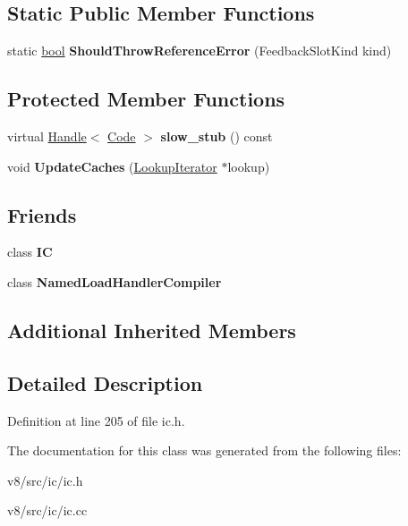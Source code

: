 \subsection*{Static Public Member Functions}
\begin{DoxyCompactItemize}
\item 
\mbox{\label{classv8_1_1internal_1_1LoadIC_a012637513bc1837e51f7ad5b7b55288a}} 
static \mbox{\hyperlink{classbool}{bool}} {\bfseries Should\+Throw\+Reference\+Error} (Feedback\+Slot\+Kind kind)
\end{DoxyCompactItemize}
\subsection*{Protected Member Functions}
\begin{DoxyCompactItemize}
\item 
\mbox{\label{classv8_1_1internal_1_1LoadIC_a8d18be74bf36e2d94ee495119b1b034b}} 
virtual \mbox{\hyperlink{classv8_1_1internal_1_1Handle}{Handle}}$<$ \mbox{\hyperlink{classv8_1_1internal_1_1Code}{Code}} $>$ {\bfseries slow\+\_\+stub} () const
\item 
\mbox{\label{classv8_1_1internal_1_1LoadIC_a16c61b33868d2d10cd64a1acff513cb8}} 
void {\bfseries Update\+Caches} (\mbox{\hyperlink{classv8_1_1internal_1_1LookupIterator}{Lookup\+Iterator}} $\ast$lookup)
\end{DoxyCompactItemize}
\subsection*{Friends}
\begin{DoxyCompactItemize}
\item 
\mbox{\label{classv8_1_1internal_1_1LoadIC_ae59e849648858af1fd22081890d47b78}} 
class {\bfseries IC}
\item 
\mbox{\label{classv8_1_1internal_1_1LoadIC_a6b48f1913ba5071414078c6dc0290315}} 
class {\bfseries Named\+Load\+Handler\+Compiler}
\end{DoxyCompactItemize}
\subsection*{Additional Inherited Members}


\subsection{Detailed Description}


Definition at line 205 of file ic.\+h.



The documentation for this class was generated from the following files\+:\begin{DoxyCompactItemize}
\item 
v8/src/ic/ic.\+h\item 
v8/src/ic/ic.\+cc\end{DoxyCompactItemize}

